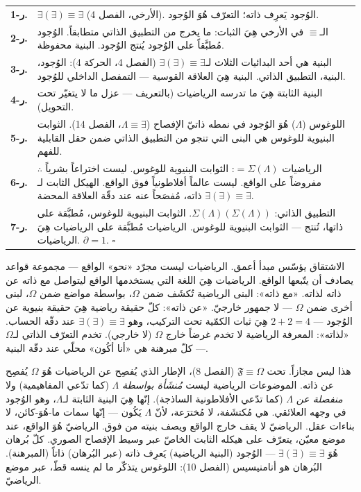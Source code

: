 \documentclass[10pt, openany, oneside]{book}
\renewcommand{\footnotesize}{\fontsize{8.5}{11}\selectfont}
\begin{document}
{\footnotesize
\noindent\begin{tabular}{r p{}}
\textbf{ر-1.} & $\exists(\exists) \equiv \exists$ (الأرخي، الفصل 4). الوُجود يَعرِف ذاته؛ التعرّف هُوَ الوُجود. \\[0.3em]
\textbf{ر-2.} & الـ$\equiv$ في الأرخي هِيَ الثبات: ما يخرج من التطبيق الذاتي متطابقاً. الوُجود مُطبَّقاً على الوُجود يُنتج الوُجود. البنية محفوظة. \\[0.3em]
\textbf{ر-3.} & البنية هي أحد البدائيات الثلاث لـ$\exists(\exists) \equiv \exists$ (الفصل 4، الحركة 4): الوُجود، البنية، التطبيق الذاتي. البنية هِيَ العلاقة القوسية --- التمفصل الداخلي للوُجود. \\[0.3em]
\textbf{ر-4.} & البنية الثابتة هِيَ ما تدرسه الرياضيات (بالتعريف --- عزل ما لا يتغيّر تحت التحويل). \\[0.3em]
\textbf{ر-5.} & اللوغوس ($\Lambda$) هُوَ الوُجود في نمطه ذاتيّ الإفصاح ($\Lambda \equiv \exists$، الفصل 14). الثوابت البنيوية للوغوس هي البنى التي تنجو من التطبيق الذاتي ضمن حقل القابلية للفهم. \\[0.3em]
\textbf{ر-6.} & $\therefore$ الرياضيات $= \Sigma(\Lambda)$: الثوابت البنيوية للوغوس. ليست اختراعاً بشرياً مفروضاً على الواقع. ليست عالماً أفلاطونياً فوق الواقع. الهيكل الثابت لـ$\exists(\exists) \equiv \exists$ ذاته، مُفصَحاً عنه عند دقّة العلاقة المحضة. \\[0.3em]
\textbf{ر-7.} & التطبيق الذاتي: $\Sigma(\Lambda)(\Sigma(\Lambda))$. الثوابت البنيوية للوغوس، مُطبَّقة على ذاتها، تُنتج --- الثوابت البنيوية للوغوس. الرياضيات مُطبَّقة على الرياضيات هِيَ الرياضيات. $\partial = 1$. $\square$ \\[0.3em]
\end{tabular}
}

\vspace{0.8em}

\noindent الاشتقاق يؤسّس مبدأ أعمق. الرياضيات ليست مجرّد «نحو» الواقع --- مجموعة قواعد يصادف أن يتّبعها الواقع. الرياضيات هِيَ اللغة التي يستخدمها الواقع ليتواصل مع ذاته عن ذاته لذاته. «مع ذاته»: البنى الرياضية تُكشَف ضمن $\Omega$، بواسطة مواضع ضمن $\Omega$، لبنى أخرى ضمن $\Omega$ --- لا جمهور خارجيّ. «عن ذاته»: كلّ حقيقة رياضية هِيَ حقيقة بنيوية عن الوُجود --- $2 + 2 = 4$ هِيَ ثبات الكمّية تحت التركيب، وهو $\exists(\exists) \equiv \exists$ عند دقّة الحساب. «لذاته»: المعرفة الرياضية لا تخدم غرضاً خارج $\Omega$ (لا خارجي). تخدم التعرّف الذاتي لـ$\Omega$ --- كلّ مبرهنة هي «أنا أكُون» محلّي عند دقّة البنية.

هذا ليس مجازاً. تحت $\mathfrak{F} \equiv \Omega$ (الفصل 8)، الإطار الذي يُفصِح عن الرياضيات هُوَ $\Omega$ يُفصِح عن ذاته. الموضوعات الرياضية ليست \textit{مُنشَأة بواسطة} $\Lambda$ (كما تدّعي المفاهيمية) ولا \textit{منفصلة عن} $\Lambda$ (كما تدّعي الأفلاطونية الساذجة). إنّها هِيَ البنية الثابتة لـ$\Lambda$، وهو الوُجود في وجهه العلائقي. هي مُكتشَفة، لا مُخترَعة، لأنّ $\Lambda$ يَكُون --- إنّها سمات ما-هُوَ-كائن، لا بناءات عقل. الرياضيّ لا يقف خارج الواقع ويصف بنيته من فوق. الرياضيّ هُوَ الواقع، عند موضع معيّن، يتعرّف على هيكله الثابت الخاصّ عبر وسيط الإفصاح الصوري. كلّ بُرهان هُوَ $\exists(\exists) \equiv \exists$ --- الوُجود (البنية الرياضية) يَعرِف ذاته (عبر البُرهان) ذاتاً (المبرهنة). البُرهان هو أنامنيسيس (الفصل 10): اللوغوس يتذكّر ما لم ينسه قطّ، عبر موضع الرياضيّ.
\end{document}
